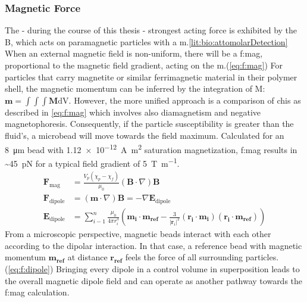 \subsubsection{Magnetic Force}
The - during the course of this thesis - strongest acting force is exhibited by the \gls{B}, which acts on paramagnetic particles with a \gls{m}.\cref{lit:bio:attomolarDetection} When an external magnetic field is non-uniform, there will be a \gls{f:mag}, proportional to the magnetic field gradient, acting on the \gls{m}.(\cref{eq:f:mag}) For particles that carry magnetite or similar ferrimagnetic material in their polymer shell, the magnetic momentum can be inferred by the integration of \gls{M}: $\mathbf{m} = \int\int\int \mathbf{M} \text{dV}$. However, the more unified approach is a comparison of \glspl{chi} as described in \cref{eq:f:mag} which involves also diamagnetism and negative magnetophoresis. Consequently, if the particle susceptibility is greater than the fluid's, a microbead will move towards the field maximum. Calculated for an \SI{8}{\micro\meter} bead with \SI{1.12e-12}{\ampere\meter\squared} saturation magnetization, \gls{f:mag} results in \textasciitilde{}\SI{45}{\pico\newton} for a typical field gradient of \SI{5}{\tesla\per\meter}.
\begin{align}	
	\mathbf{F}_\text{mag} &=\frac{V_{p}\left(\chi_{p}-\chi_{f}\right)}{\mu_{0}}(\mathbf{B} \cdot \nabla) \mathbf{B} \label{eq:f:mag}	\\
	\mathbf{F}_\text{dipole} &=\left(\mathbf{m}\cdot \nabla \right) \mathbf{B} = -\nabla \mathbf{E}_\text{dipole}\\
	\mathbf{E}_\text{dipole}&=\sum_{i-1}^{n} \frac{\mu_{0}}{4 \pi r_{i}^{3}}\left(\mathbf{m}_{\mathbf{i}} \cdot \mathbf{m}_{\mathbf{ref}}-\frac{3}{|\mathbf{r}_{i}|^{2}}\left(\mathbf{r}_{\mathbf{i}} \cdot \mathbf{m}_{\mathbf{i}}\right)\left(\mathbf{r}_{\mathbf{i}} \cdot \mathbf{m}_{\mathbf{ref}}\right)\right)  \label{eq:f:dipole}
\end{align}
From a microscopic perspective, magnetic beads interact with each other according to the dipolar interaction. In that case, a reference bead with magnetic momentum $\mathbf{m}_{\mathbf{ref}}$ at distance $\mathbf{r}_{\mathbf{ref}}$ feels the force of all surrounding particles.(\cref{eq:f:dipole}) Bringing every dipole in a control volume in superposition leads to the overall magnetic dipole field and can operate as another pathway towards the \gls{f:mag} calculation.


